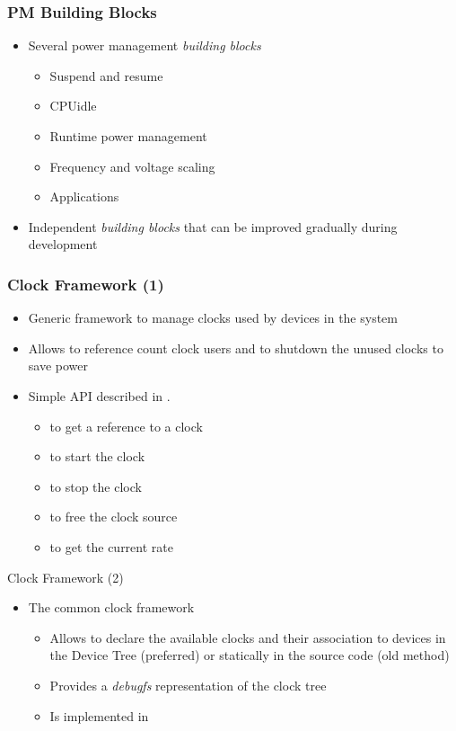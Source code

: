 \begin{frame}
  \frametitle{PM Building Blocks}
  \begin{itemize}
  \item Several power management \emph{building blocks}
    \begin{itemize}
    \item Suspend and resume
    \item CPUidle
    \item Runtime power management
    \item Frequency and voltage scaling
    \item Applications
    \end{itemize}
  \item Independent \emph{building blocks} that can be improved
    gradually during development
  \end{itemize}
\end{frame}

\begin{frame}
  \frametitle{Clock Framework (1)}
  \begin{itemize}
  \item Generic framework to manage clocks used by devices in the
    system
  \item Allows to reference count clock users and to shutdown the
    unused clocks to save power
  \item Simple API described in .
    \begin{itemize}
    \item {} to get a reference to a clock
    \item {} to start the clock
    \item {} to stop the clock
    \item {} to free the clock source
    \item {} to get the current rate
    \end{itemize}
  \end{itemize}
\end{frame}


\begin{frame}{Clock Framework (2)}
  \begin{itemize}
  \item The common clock framework
    \begin{itemize}
    \item Allows to declare the available clocks and their association
      to devices in the Device Tree (preferred) or statically in the
      source code (old method)
    \item Provides a {\em debugfs} representation of the clock tree
    \item Is implemented in 
    \end{itemize}
  \end{itemize}
\end{frame}

